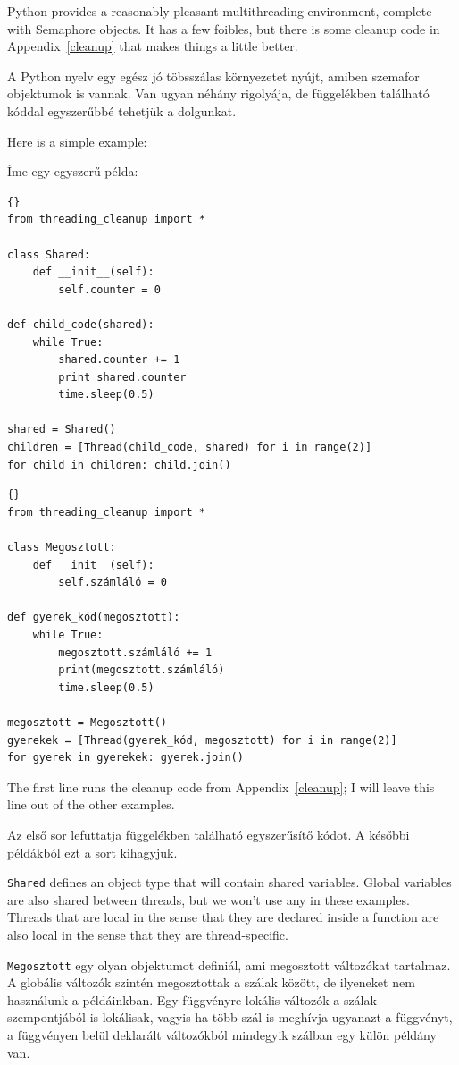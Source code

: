 \documentclass{book}
\begin{document}
Python provides a reasonably pleasant multithreading environment,
complete with Semaphore objects.  It has
a few foibles, but there is some cleanup code in Appendix~\ref{cleanup}
that makes things a little better.

A Python nyelv egy egész jó töbsszálas környezetet nyújt, amiben szemafor
objektumok is vannak. Van ugyan néhány rigolyája, de 
függelékben található kóddal egyszerűbbé tehetjük a dolgunkat.

Here is a simple example:

Íme egy egyszerű példa:

\begin{lstlisting}[title={}]{}
from threading_cleanup import *

class Shared:
    def __init__(self):
        self.counter = 0

def child_code(shared):
    while True:
        shared.counter += 1
        print shared.counter
        time.sleep(0.5)

shared = Shared()
children = [Thread(child_code, shared) for i in range(2)]
for child in children: child.join()
\end{lstlisting}

\begin{lstlisting}[title={}]{}
from threading_cleanup import *

class Megosztott:
    def __init__(self):
        self.számláló = 0

def gyerek_kód(megosztott):
    while True:
        megosztott.számláló += 1
        print(megosztott.számláló)
        time.sleep(0.5)

megosztott = Megosztott()
gyerekek = [Thread(gyerek_kód, megosztott) for i in range(2)]
for gyerek in gyerekek: gyerek.join()
\end{lstlisting}

The first line runs the cleanup code from Appendix~\ref{cleanup};
I will leave this line out of the other examples.

Az első sor lefuttatja \az{\ref{cleanup}} függelékben található
egyszerűsítő kódot. A későbbi példákból ezt a sort kihagyjuk.

{\tt Shared} defines an object type that will contain shared variables.
Global variables are also shared between threads, but we won't
use any in these examples.  Threads that are local in the sense
that they are declared inside a function are also local in the
sense that they are thread-specific.

{\tt Megosztott} egy olyan objektumot definiál, ami megosztott
változókat tartalmaz. A globális változók szintén megosztottak
a szálak között, de ilyeneket nem használunk a példáinkban.
Egy függvényre lokális változók a szálak szempontjából is
lokálisak, vagyis ha több szál is meghívja ugyanazt a függvényt,
a függvényen belül deklarált változókból mindegyik szálban egy
külön példány van.
\end{document}
